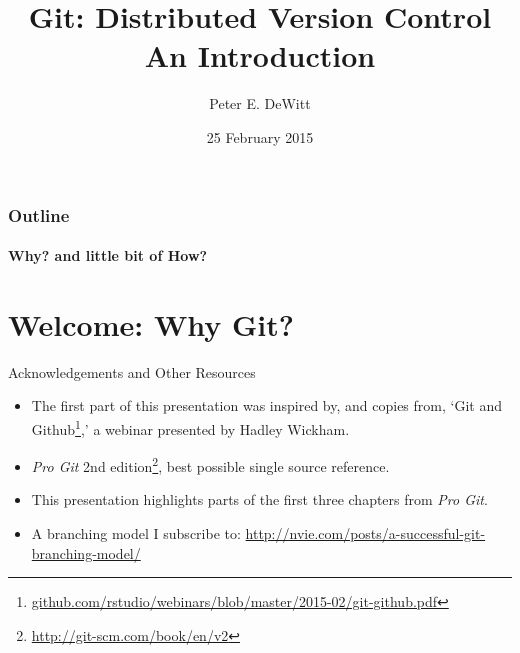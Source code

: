 \ifuseblack
\else
\fi


\author{Peter E. DeWitt}
\title[Intro to Git]{Git: Distributed Version Control \\ {\small An
Introduction}}
\date{25 February 2015}



 
  \watermarkoff

  \begin{frame}[t,plain]
    \titlepage
  \end{frame}

  \begin{frame}[t]
    \frametitle{Outline}
    \framesubtitle{Why? and little bit of How?}
    \tableofcontents[hideallsubsections] 
  \end{frame}

  \section{Welcome: Why Git?}
  \begin{frame}[t]{Acknowledgements and Other Resources}
    \begin{itemize}
      \item The first part of this presentation was inspired by, and copies
        from, `Git and
        Github\footnote{\url{github.com/rstudio/webinars/blob/master/2015-02/git-github.pdf}},' a webinar presented by Hadley Wickham.
      \item {\it Pro Git} 2nd
        edition\footnote{\url{http://git-scm.com/book/en/v2}}, best possible
        single source reference.
      \item This presentation highlights parts of the first three chapters from
        {\it Pro Git}.
      \item A branching model I subscribe to:
        \url{http://nvie.com/posts/a-successful-git-branching-model/}
    \end{itemize} 
  \end{frame}

